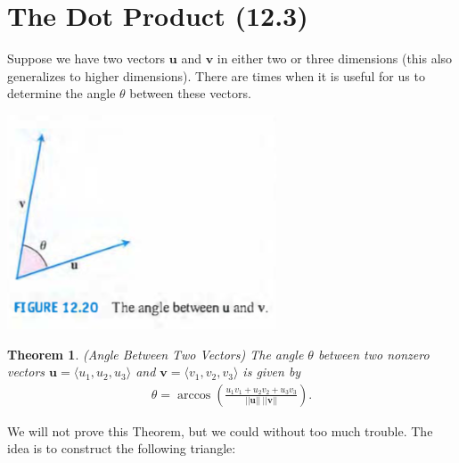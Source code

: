 \documentclass[12pt, letter]{article}
\theoremstyle{plain}
\newtheorem{theorem}{Theorem}
\numberwithin{theorem}{section}
\theoremstyle{definition}
\begin{document}
\newpage


\section{The Dot Product (12.3)}

Suppose we have two vectors $\bm{u}$ and $\bm{v}$ in either two or three dimensions (this also generalizes to higher dimensions). There are times when it is useful for us to determine the angle $\theta$ between these vectors.

\bigskip

\begin{center}
\includegraphics[scale=0.8]{m1_f6}
\end{center}

\bigskip

\hrulefill

\bigskip

\begin{theorem}{(\emph{Angle Between Two Vectors})}
The angle $\theta$ between two nonzero vectors $\bm{u} = \langle u_1, u_2, u_3 \rangle$ and $\bm{v} = \langle v_1, v_2, v_3 \rangle$ is given by
\begin{align*}
\theta = \arccos\left(\frac{u_1v_1+u_2v_2+u_3v_3}{||\bm{u}|| \ ||\bm{v}||}\right).
\end{align*}
\end{theorem}

\bigskip

\hrulefill

\bigskip

We will not prove this Theorem, but we could without too much trouble. The idea is to construct the following triangle:
\end{document}
